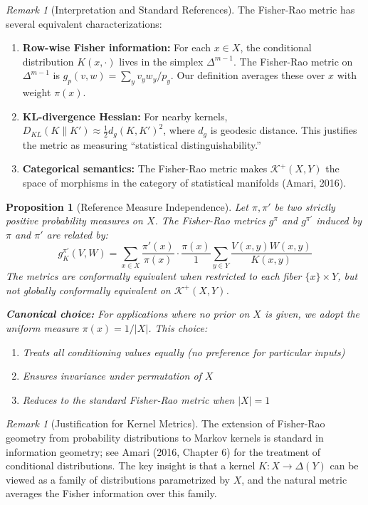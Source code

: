 \documentclass[11pt,a4paper]{article}
\theoremstyle{definition}
\theoremstyle{plain}
\newtheorem{proposition}[definition]{Proposition}
\theoremstyle{remark}
\newtheorem{remark}[definition]{Remark}
\begin{document}
\begin{remark}[Interpretation and Standard References]
The Fisher-Rao metric has several equivalent characterizations:
\begin{enumerate}[label=(\roman*)]
    \item \textbf{Row-wise Fisher information:} For each $x \in X$, the conditional distribution $K(x, \cdot)$ lives in the simplex $\Delta^{m-1}$. The Fisher-Rao metric on $\Delta^{m-1}$ is $g_p(v, w) = \sum_y v_y w_y / p_y$. Our definition averages these over $x$ with weight $\pi(x)$.

    \item \textbf{KL-divergence Hessian:} For nearby kernels, $D_{KL}(K \| K') \approx \frac{1}{2} d_g(K, K')^2$, where $d_g$ is geodesic distance. This justifies the metric as measuring ``statistical distinguishability.''

    \item \textbf{Categorical semantics:} The Fisher-Rao metric makes $\mathcal{K}^+(X, Y)$ the space of morphisms in the category of statistical manifolds (Amari, 2016).
\end{enumerate}
\end{remark}

\begin{proposition}[Reference Measure Independence]\label{prop:reference-measure}
Let $\pi, \pi'$ be two strictly positive probability measures on $X$. The Fisher-Rao metrics $g^\pi$ and $g^{\pi'}$ induced by $\pi$ and $\pi'$ are related by:
\[
g^{\pi'}_K(V, W) = \sum_{x \in X} \frac{\pi'(x)}{\pi(x)} \cdot \frac{\pi(x)}{1} \sum_{y \in Y} \frac{V(x,y) W(x,y)}{K(x,y)}
\]
The metrics are \emph{conformally equivalent} when restricted to each fiber $\{x\} \times Y$, but not globally conformally equivalent on $\mathcal{K}^+(X, Y)$.

\textbf{Canonical choice:} For applications where no prior on $X$ is given, we adopt the uniform measure $\pi(x) = 1/|X|$. This choice:
\begin{enumerate}[label=(\roman*)]
    \item Treats all conditioning values equally (no preference for particular inputs)
    \item Ensures invariance under permutation of $X$
    \item Reduces to the standard Fisher-Rao metric when $|X| = 1$
\end{enumerate}
\end{proposition}

\begin{remark}[Justification for Kernel Metrics]
The extension of Fisher-Rao geometry from probability distributions to Markov kernels is standard in information geometry; see Amari (2016, Chapter 6) for the treatment of conditional distributions. The key insight is that a kernel $K: X \to \Delta(Y)$ can be viewed as a family of distributions parametrized by $X$, and the natural metric averages the Fisher information over this family.
\end{remark}
\end{document}
